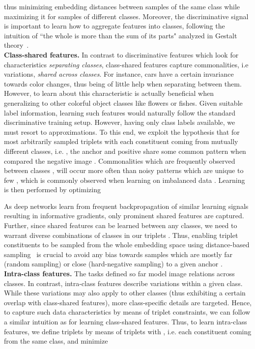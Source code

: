 \documentclass[runningheads]{llncs}
\begin{document}
\noindent
thus minimizing embedding distances between samples of the same class while maximizing it for samples of different classes. Moreover, the discriminative signal is important to learn how to aggregate features into classes, following the intuition of ``the whole is more than the sum of its parts" analyzed in Gestalt theory~\cite{gestalt}.
\\
\textbf{Class-shared features.} 
In contrast to discriminative features which look for characteristics \textit{separating classes}, class-shared features capture commonalities, i.e variations, \textit{shared across classes}. For instance, cars have a certain invariance towards color changes, thus being of little help when separating between them. However, to learn about this characteristic is actually beneficial when generalizing to other colorful object classes like flowers or fishes. Given suitable label information, learning such features would naturally follow the standard discriminative training setup. 
However, having only class labels available, we must resort to approximations. To this end, we exploit the hypothesis that for most arbitrarily sampled triplets  with each constituent coming from mutually different classes, i.e. , the anchor  and positive  share some common pattern when compared the negative image . Commonalities which are frequently observed between classes , will occur more often than noisy patterns which are unique to few , which is commonly observed when learning on imbalanced data \cite{imb1,imb2,imb3}. Learning is then performed by optimizing



\noindent
As deep networks learn from frequent backpropagation of similar learning signals resulting in informative gradients, only prominent shared features are captured. Further, since shared features can be learned between any classes, we need to warrant diverse combinations of classes in our triplets . Thus, enabling triplet constituents to be sampled from the whole embedding space  using distance-based sampling~\cite{margin} is crucial to avoid any bias towards samples which are mostly far (random sampling) or close (hard-negative sampling) to a given anchor . 
\\
\textbf{Intra-class features.}
The tasks defined so far model image relations across classes. In contrast, intra-class features describe variations within a given class. While these variations may also apply to other classes (thus exhibiting a certain overlap with class-shared features), more class-specific details are targeted. Hence, to capture such data characteristics by means of triplet constraints, we can follow a similar intuition as for learning class-shared features. Thus, to learn intra-class features, we define triplets by means of triplets  with , i.e. each constituent coming from the same class, and minimize 
\end{document}
